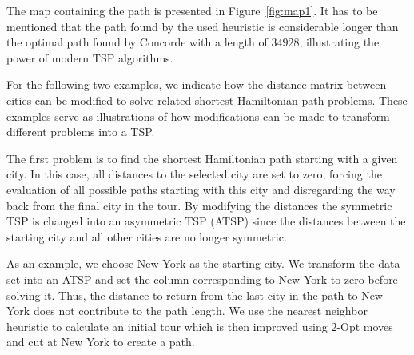 \documentclass[10pt,a4paper,fleqn]{article}
\begin{document}
The map containing the path is presented in Figure~\ref{fig:map1}.  It
has to be mentioned that the path found by the used heuristic is
considerable longer than the optimal path found by Concorde with a
length of $34928$, illustrating the power of modern TSP algorithms.

For the following two examples, we indicate how the distance matrix
between cities can be modified to solve related shortest Hamiltonian
path problems.  These examples serve as illustrations of how
modifications can be made to transform different problems into a TSP.

The first problem is to find the shortest Hamiltonian path starting with
a given city. In this case, all distances to the selected city are set
to zero, forcing the evaluation of all possible paths starting with this
city and disregarding the way back from the final city in the tour.  By
modifying the distances the symmetric TSP is changed into an asymmetric
TSP (ATSP) since the distances between the starting city and all other
cities are no longer symmetric.

As an example, we choose New York as the starting city.  We transform
the data set into an ATSP and set the column corresponding to New York
to zero before solving it.  Thus, the distance to return from the last
city in the path to New York does not contribute to the path length.  We
use the nearest neighbor heuristic to calculate an initial tour which is
then improved using $2$-Opt moves and cut at New York to create a path.
\end{document}
